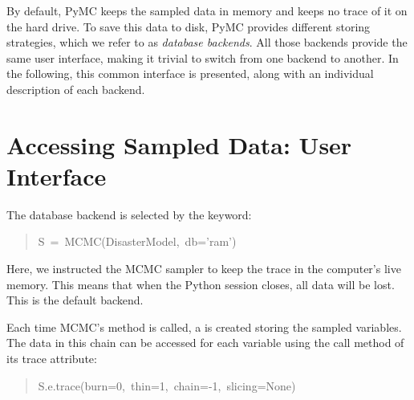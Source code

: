 

By default, PyMC keeps the sampled data in memory and keeps no trace of it on the hard drive. To save this data to disk, PyMC provides different storing strategies, which we refer to as \emph{database backends}. All those backends provide the same user interface, making it trivial to switch from one backend to another. In the following, this common interface is presented, along with an individual description of each backend.



\hypertarget{accessing-sampled-data-user-interface}{}
\section*{Accessing Sampled Data: User Interface}

The database backend is selected by the  keyword:
\begin{quote}{\ttfamily \raggedright \noindent
S~=~MCMC(DisasterModel,~db='ram')
}\end{quote}

Here, we instructed the MCMC sampler to keep the trace in the computer's live memory. This means that when the Python session closes, all data will be lost. This is the default backend.

Each time MCMC's  method is called, a  is created storing the sampled variables. The data in this chain can be accessed for each variable using the call method of its trace attribute:
\begin{quote}{\ttfamily \raggedright \noindent
S.e.trace(burn=0,~thin=1,~chain=-1,~slicing=None)
}\end{quote}

